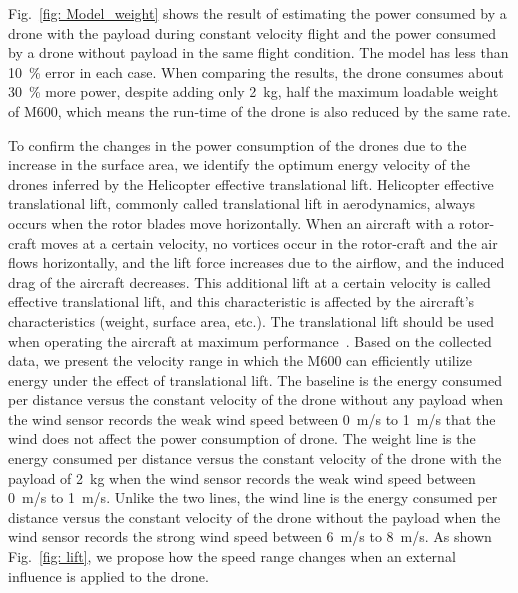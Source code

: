 \documentclass[journal]{./template/IEEEtran}
\begin{document}
Fig.~\ref{fig: Model_weight} shows the result of estimating the power consumed by a drone with the payload during constant velocity flight and the power consumed by a drone without payload in the same flight condition. The model has less than 10~\% error in each case. 
When comparing the results, the drone consumes about 30~\% more power, despite adding only 2~kg, half the maximum loadable weight of M600, which means the run-time of the drone is also reduced by the same rate.

To confirm the changes in the power consumption of the drones due to the increase in the surface area, we identify the optimum energy velocity of the drones inferred by the Helicopter effective translational lift.
Helicopter effective translational lift, commonly called translational lift in aerodynamics, always occurs when the rotor blades move horizontally. When an aircraft with a rotor-craft moves at a certain velocity, no vortices occur in the rotor-craft and the air flows horizontally, and the lift force increases due to the airflow, and the induced drag of the aircraft decreases. 
This additional lift at a certain velocity is called effective translational lift, and this characteristic is affected by the aircraft's characteristics (weight, surface area, etc.). 
The translational lift should be used when operating the aircraft at maximum performance~\cite{ref_20}.
Based on the collected data, we present the velocity range in which the M600 can efficiently utilize energy under the effect of translational lift. 
The baseline is the energy consumed per distance versus the constant velocity of the drone without any payload when the wind sensor records the weak wind speed between 0~m/s to 1~m/s that the wind does not affect the power consumption of drone.
The weight line is the energy consumed per distance versus the constant velocity of the drone with the payload of 2~kg when the wind sensor records the weak wind speed between 0~m/s to 1~m/s.
Unlike the two lines, the wind line is the energy consumed per distance versus the constant velocity of the drone without the payload when the wind sensor records the strong wind speed between 6~m/s to 8~m/s. 
As shown Fig.~\ref{fig: lift}, we propose how the speed range changes when an external influence is applied to the drone.
\end{document}
